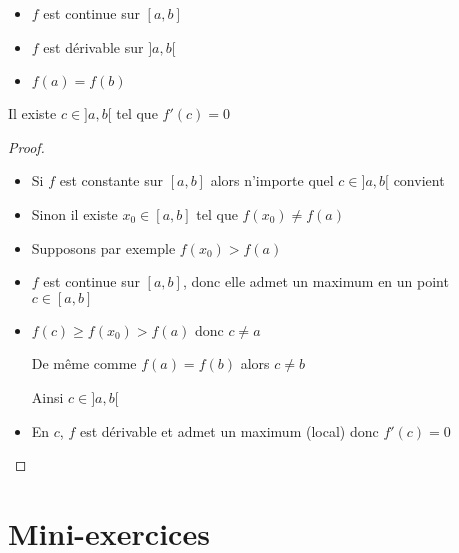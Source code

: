 \begin{frame}

\begin{theoreme}[de Rolle]
\label{th:rolle}

\begin{minipage}{0.47\textwidth}
\begin{itemize}
  \item $f$ est continue sur $[a,b]$

  \item $f$ est dérivable sur $]a,b[$

  \item $f(a)=f(b)$
\end{itemize}  
\end{minipage}
\begin{minipage}{0.49\textwidth}
Il existe $c \in ]a,b[$  tel que $f'(c)=0$  
\end{minipage}
\end{theoreme}


\begin{proof}
\pause
\begin{itemize}
  \item Si $f$ est constante sur $[a,b]$ alors n'importe quel $c\in]a,b[$ convient
\pause
  \item Sinon il existe $x_0 \in [a,b]$ tel que $f(x_0) \neq f(a)$
\pause
  \item Supposons par exemple $f(x_0) > f(a)$
\pause
  \item $f$ est continue sur $[a,b]$, donc elle admet un maximum en un point $c\in[a,b]$
\pause
  \item  $f(c) \ge f(x_0) > f(a)$ donc $c \neq a$

\pause 
De même comme $f(a)=f(b)$ alors  $c\neq b$

\pause 
Ainsi $c\in ]a,b[$

\pause 
  \item En $c$, $f$ est dérivable et admet un maximum (local) donc $f'(c)=0$
\end{itemize}
\end{proof}
\end{frame}






\section*{Mini-exercices}


